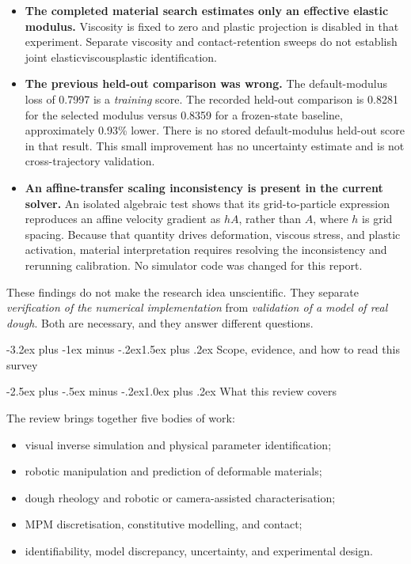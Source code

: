 \documentclass[
  11pt,
]{article}
\makeatletter
\providecommand{\tightlist}{%
  \setlength{\itemsep}{0pt}\setlength{\parskip}{0pt}}
\renewcommand\section{\needspace{7\baselineskip}\@startsection{section}{1}{\z@}%
  {-3.2ex plus -1ex minus -.2ex}{1.5ex plus .2ex}%
  {\normalfont\sffamily\Large\bfseries\color{accent}}}
\renewcommand\subsection{\needspace{5\baselineskip}\@startsection{subsection}{2}{\z@}%
  {-2.5ex plus -.5ex minus -.2ex}{1.0ex plus .2ex}%
  {\normalfont\sffamily\large\bfseries\color{accent}}}
\makeatother
\begin{document}
\begin{itemize}
\tightlist
\item
  \textbf{The completed material search estimates only an effective
  elastic modulus.} Viscosity is fixed to zero and plastic projection is
  disabled in that experiment. Separate viscosity and contact-retention
  sweeps do not establish joint
  elastic\textendash{}\allowbreak{}viscous\textendash{}\allowbreak{}plastic
  identification.
\item
  \textbf{The previous held-out comparison was wrong.} The
  default-modulus loss of 0.7997 is a \emph{training} score. The
  recorded held-out comparison is 0.8281 for the selected modulus versus
  0.8359 for a frozen-state baseline, approximately 0.93\% lower. There
  is no stored default-modulus held-out score in that result. This small
  improvement has no uncertainty estimate and is not cross-trajectory
  validation.
\item
  \textbf{An affine-transfer scaling inconsistency is present in the
  current solver.} An isolated algebraic test shows that its
  grid-to-particle expression reproduces an affine velocity gradient as
  \(hA\), rather than \(A\), where \(h\) is grid spacing. Because that
  quantity drives deformation, viscous stress, and plastic activation,
  material interpretation requires resolving the inconsistency and
  rerunning calibration. No simulator code was changed for this report.
\end{itemize}

These findings do not make the research idea unscientific. They separate
\emph{verification of the numerical implementation} from
\emph{validation of a model of real dough}. Both are necessary, and they
answer different questions.

\section{Scope, evidence, and how to read this
survey}\label{scope-evidence-and-how-to-read-this-survey}

\subsection{What this review covers}\label{what-this-review-covers}

The review brings together five bodies of work:

\begin{itemize}
\tightlist
\item
  visual inverse simulation and physical parameter identification;
\item
  robotic manipulation and prediction of deformable materials;
\item
  dough rheology and robotic or camera-assisted characterisation;
\item
  MPM discretisation, constitutive modelling, and contact;
\item
  identifiability, model discrepancy, uncertainty, and experimental
  design.
\end{itemize}
\end{document}

